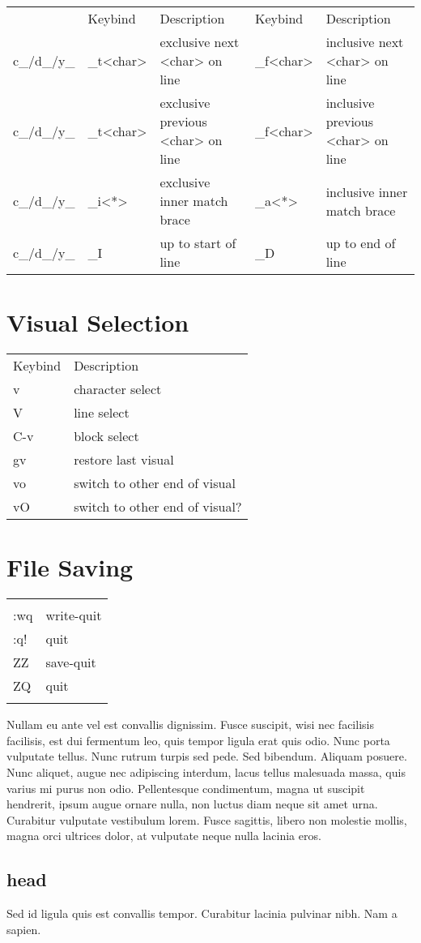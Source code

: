 \documentclass[11pt]{article}
\begin{document}
\begin{center}
\begin{tabular}{lllll}
 & Keybind & Description & Keybind & Description\\
c\_/d\_/y\_ & \_t<char> & exclusive next <char> on line & \_f<char> & inclusive next <char> on line\\
c\_/d\_/y\_ & \_t<char> & exclusive previous <char> on line & \_f<char> & inclusive previous <char> on line\\
c\_/d\_/y\_ & \_i<*> & exclusive inner match brace & \_a<*> & inclusive inner match brace\\
c\_/d\_/y\_ & \_I & up to start of line & \_D & up to end of line\\
\end{tabular}
\end{center}
\section{Visual Selection}
\label{sec:org2e2eea8}

\begin{center}
\begin{tabular}{ll}
Keybind & Description\\
v & character select\\
V & line select\\
C-v & block select\\
gv & restore last visual\\
vo & switch to other end of visual\\
vO & switch to other end of visual?\\
\end{tabular}
\end{center}
\section{File Saving}
\label{sec:orgedd8786}
\begin{center}
\begin{tabular}{ll}
 & \\
:wq & write-quit\\
:q! & quit\\
ZZ & save-quit\\
ZQ & quit\\
 & \\
\end{tabular}
\end{center}

    Nullam eu ante vel est convallis dignissim.
Fusce suscipit, wisi nec facilisis facilisis, est dui fermentum leo, quis tempor ligula erat quis odio.
Nunc porta vulputate tellus.
Nunc rutrum turpis sed pede.
Sed bibendum.
Aliquam posuere.
Nunc aliquet, augue nec adipiscing interdum, lacus tellus malesuada massa, quis varius mi purus non odio.
Pellentesque condimentum, magna ut suscipit hendrerit, ipsum augue ornare nulla, non luctus diam neque sit amet urna.
Curabitur vulputate vestibulum lorem.
Fusce sagittis, libero non molestie mollis, magna orci ultrices dolor, at vulputate neque nulla lacinia eros.
\subsection{head}
\label{sec:orgfb4773d}
Sed id ligula quis est convallis tempor.  Curabitur lacinia pulvinar nibh.  Nam a sapien.
\end{document}
